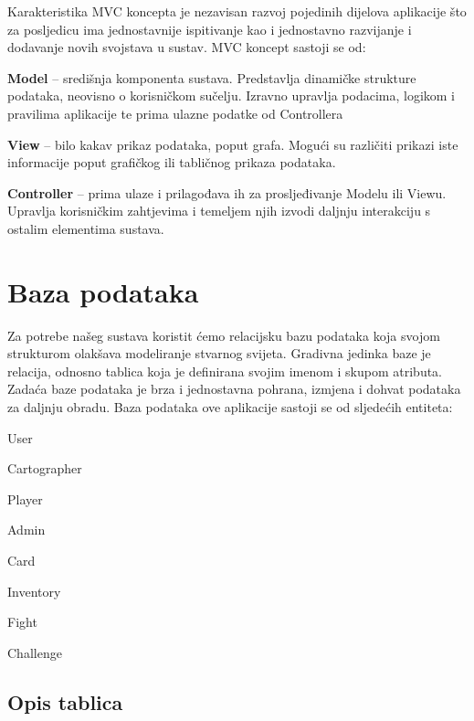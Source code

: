         Karakteristika MVC koncepta je nezavisan razvoj pojedinih dijelova aplikacije što za posljedicu ima jednostavnije ispitivanje kao i jednostavno razvijanje i dodavanje novih svojstava u sustav.
        MVC koncept sastoji se od:
        \begin{packed_item}
            \item \textbf{Model} – središnja komponenta sustava. Predstavlja dinamičke strukture podataka, neovisno o korisničkom sučelju. Izravno upravlja podacima, logikom i pravilima aplikacije te prima ulazne podatke od Controllera
            \item \textbf{View} – bilo kakav prikaz podataka, poput grafa. Mogući su različiti prikazi iste informacije poput grafičkog ili tabličnog prikaza podataka.
            \item \textbf{Controller} – prima ulaze i prilagođava ih za prosljeđivanje Modelu ili Viewu. Upravlja korisničkim zahtjevima i temeljem njih izvodi daljnju interakciju s ostalim elementima sustava.
        \end{packed_item}

		\pagebreak	
		\section{Baza podataka}
			
			Za potrebe našeg sustava koristit ćemo relacijsku bazu podataka koja svojom strukturom olakšava modeliranje stvarnog svijeta. Gradivna jedinka baze je relacija, odnosno tablica koja je definirana svojim imenom i skupom atributa. Zadaća baze podataka je brza i jednostavna pohrana, izmjena i dohvat podataka za daljnju obradu. Baza podataka ove aplikacije sastoji se od sljedećih entiteta:
			\begin{packed_item}
			    \item User
                \item Cartographer
                \item Player
                \item Admin
                \item Card
                \item Inventory
                \item Fight
                \item Challenge
			\end{packed_item}


		
			\subsection{Opis tablica}
			

